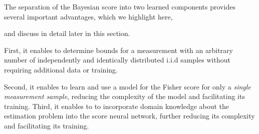 {%
The separation of the Bayesian score into two learned components %
provides several important} 
advantages, which we highlight here, {and discuss in detail later in this section.

}
First, it enables to determine
bounds 
{for a measurement with} 
an arbitrary number of 
independently and identically distributed 
i.i.d samples without requiring additional data or training.

{Second, it enables to learn and use a model for the Fisher score for only a \emph{single measurement sample}, reducing the complexity of the model and facilitating its training. 
Third, it enables to}
to incorporate domain knowledge about the estimation problem %
into the score neural network{, further reducing its complexity and facilitating its training.
}


